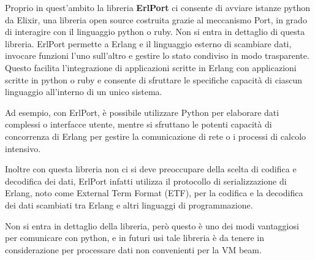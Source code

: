 Proprio in quest'ambito la libreria \textbf{ErlPort} ci consente
di avviare istanze python da Elixir, una libreria open source
costruita grazie al meccanismo Port, in grado di interagire con
il linguaggio python o ruby. Non si entra in dettaglio di
questa libreria.
ErlPort permette a Erlang e il linguaggio esterno di scambiare
dati, invocare funzioni l'uno sull'altro e gestire lo stato
condiviso in modo trasparente.
Questo facilita l'integrazione di applicazioni scritte in
Erlang con applicazioni scritte in python o ruby e consente di
sfruttare le specifiche capacità di ciascun linguaggio
all'interno di un unico sistema.

Ad esempio, con ErlPort, è possibile utilizzare Python
per elaborare dati complessi o interfacce utente,
mentre si sfruttano le potenti capacità di concorrenza di
Erlang per gestire la comunicazione di rete o i
processi di calcolo intensivo.

Inoltre con questa libreria non ci si deve preoccupare
della scelta di codifica e decodifica dei dati, ErlPort
infatti utilizza il protocollo di serializzazione di Erlang,
noto come External Term Format (ETF), per la codifica e
la decodifica dei dati scambiati tra Erlang e altri
linguaggi di programmazione.

Non si entra in dettaglio della libreria, però questo è
uno dei modi vantaggiosi per comunicare con python, e
in futuri usi tale libreria è da tenere in considerazione per
processare dati non convenienti per la VM beam.


